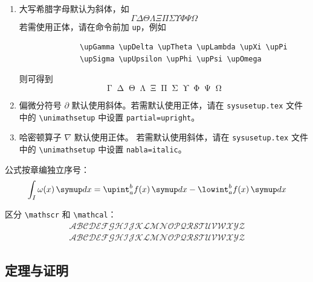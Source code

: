 \begin{enumerate}
    \item 大写希腊字母默认为斜体，如
          \begin{equation*}
              \Gamma \Delta \Theta \Lambda \Xi \Pi \Sigma \Upsilon \Phi \Psi \Omega
          \end{equation*}
          若需使用正体，请在命令前加 \verb|up|，例如
          \begin{verbatim}
              \upGamma \upDelta \upTheta \upLambda \upXi \upPi
              \upSigma \upUpsilon \upPhi \upPsi \upOmega
          \end{verbatim}
          则可得到
          \begin{equation*}
              \upGamma \upDelta \upTheta \upLambda \upXi \upPi \upSigma \upUpsilon \upPhi \upPsi \upOmega
          \end{equation*}
    \item 偏微分符号 $\partial$ 默认使用斜体。若需默认使用正体，请在 \texttt{sysusetup.tex} 文件中的 \verb|\unimathsetup| 中设置 \verb|partial=upright|。
    \item 哈密顿算子 $\nabla$ 默认使用正体。
          若需默认使用斜体，请在 \texttt{sysusetup.tex} 文件中的 \verb|\unimathsetup| 中设置 \verb|nabla=italic|。
\end{enumerate}

公式按章编独立序号：
\begin{equation}
    \int_I \omega(x)\diff x = \upint_{a}^b f(x)\diff x - \lowint_a^b f(x)\diff x
\end{equation}

区分 \verb|\mathscr| 和 \verb|\mathcal|：
\begin{gather*}
    \mathscr{A} \mathscr{B} \mathscr{C} \mathscr{D} \mathscr{E} \mathscr{F} \mathscr{G} \mathscr{H} \mathscr{I} \mathscr{J} \mathscr{K} \mathscr{L} \mathscr{M} \mathscr{N} \mathscr{O} \mathscr{P} \mathscr{Q} \mathscr{R} \mathscr{S} \mathscr{T} \mathscr{U} \mathscr{V} \mathscr{W} \mathscr{X} \mathscr{Y} \mathscr{Z}\\
    \mathcal{A} \mathcal{B} \mathcal{C} \mathcal{D} \mathcal{E} \mathcal{F} \mathcal{G} \mathcal{H} \mathcal{I} \mathcal{J} \mathcal{K} \mathcal{L} \mathcal{M} \mathcal{N} \mathcal{O} \mathcal{P} \mathcal{Q} \mathcal{R} \mathcal{S} \mathcal{T} \mathcal{U} \mathcal{V} \mathcal{W} \mathcal{X} \mathcal{Y} \mathcal{Z}
\end{gather*}

\subsection{定理与证明}

